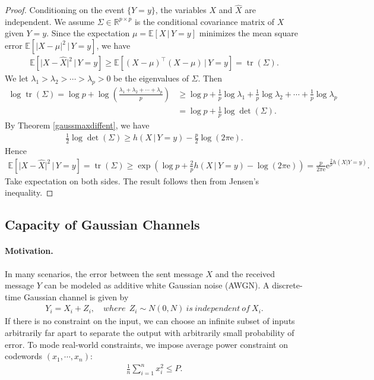 \documentclass{article}
\numberwithin{equation}{section}
\newcommand{\e}{\mathrm{e}}
\newcommand{\E}{\mathbb{E}}
\newcommand{\bbR}{\mathbb{R}}
\newcommand{\wh}{\widehat}
\DeclareMathOperator{\tr}{tr}
\theoremstyle{plain}
\theoremstyle{definition}
\begin{document}
\begin{proof}
Conditioning on the event $\{Y=y\}$, the variables $X$ and $\wh{X}$ are independent. We assume $\Sigma\in\bbR^{p\times p}$ is the conditional covariance matrix of $X$ given $Y=y$. Since the expectation $\mu=\E[X\,|\,Y=y]$ minimizes the mean square error $\E[\vert X-\mu\vert^2\,|\,Y=y]$, we have
\begin{align*}
	\E\left[\bigl\vert X-\wh{X}\bigr\vert^2\,\big|\,Y=y\right]\geq\E\left[(X-\mu)^\top(X-\mu)\,\big|\,Y=y\right]=\tr(\Sigma).
\end{align*}
We let $\lambda_1>\lambda_2>\cdots>\lambda_p>0$ be the eigenvalues of $\Sigma$. Then
\begin{align*}
	\log\tr(\Sigma)=\log p+\log\left(\frac{\lambda_1+\lambda_2+\cdots+\lambda_p}{p}\right)&\geq\log p+\frac{1}{p}\log\lambda_1+\frac{1}{p}\log\lambda_2+\cdots+\frac{1}{p}\log\lambda_p\\
	&=\log p+\frac{1}{p}\log\det(\Sigma).
\end{align*}
By Theorem \ref{gaussmaxdiffent}, we have
\begin{align*}
	\frac{1}{2}\log\det(\Sigma)\geq h(X\,|\,Y=y)-\frac{p}{2}\log(2\pi\e).
\end{align*}
Hence
\begin{align*}
	\E\left[\bigl\vert X-\wh{X}\bigr\vert^2\,\big|\,Y=y\right]=\tr(\Sigma)\geq\exp\left(\log p+\frac{2}{p}h(X\,|\,Y=y)-\log(2\pi\e)\right)=\frac{p}{2\pi\e}\e^{\frac{2}{p}h(X|Y=y)}.
\end{align*}
Take expectation on both sides. The result follows then from Jensen's inequality.
\end{proof}


\subsection{Capacity of Gaussian Channels}
\paragraph{Motivation.} In many scenarios, the error between the sent message $X$ and the received message $Y$ can be modeled as additive white Gaussian noise (AWGN). A discrete-time Gaussian channel is given by
\begin{align*}
	Y_i=X_i+Z_i,\quad where\ \ Z_i\sim N(0,N)\ is\ independent\ of\ X_i.
\end{align*}
If there is no constraint on the input, we can choose an infinite subset of inputs arbitrarily far apart to separate the output with arbitrarily small probability of error. To mode real-world constraints, we impose average power constraint on codewords $(x_1,\cdots,x_n)$:
\begin{align*}
	\frac{1}{n}\sum_{i=1}^nx_i^2\leq P.
\end{align*}
\end{document}
